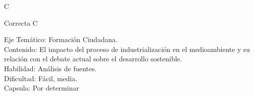 \documentclass[letterpaper,11pt]{article}
\newcommand{\anchopregunta}{0.9\textwidth}
\begin{document}
\begin{enumerate}
\begin{minipage}{\anchopregunta}
\begin{key} C
\end{key} 
\begin{hint}
\end{hint}
\begin{answer} Correcta C \\
\end{answer}
\begin{info} %
\begin{flushleft}
Eje Temático: Formación Ciudadana.\\
Contenido: El impacto del proceso de industrialización en el medioambiente y su relación con el debate actual sobre el desarrollo sostenible.\\
Habilidad: Análisis de fuentes.\\
Dificultad: Fácil, media. \\
Capsula: Por determinar \\
\end{flushleft} 
\end{info}
\end{minipage}\vfill$\;$ %


\end{enumerate}
\end{document}
